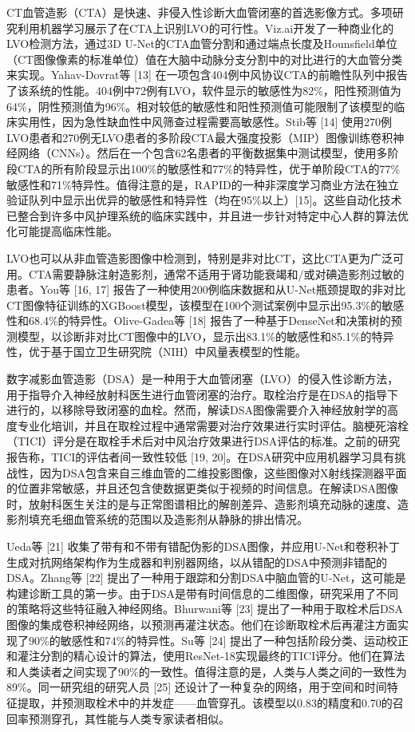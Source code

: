 \documentclass[11pt]{article}
\begin{document}
CT血管造影（CTA）是快速、非侵入性诊断大血管闭塞的首选影像方式。多项研究利用机器学习展示了在CTA上识别LVO的可行性。Viz.ai开发了一种商业化的LVO检测方法，通过3D U-Net的CTA血管分割和通过端点长度及Hounsfield单位（CT图像像素的标准单位）值在大脑中动脉分支分割中的对比进行的大血管分类来实现。Yahav-Dovrat等 [13] 在一项包含404例中风协议CTA的前瞻性队列中报告了该系统的性能。404例中72例有LVO，软件显示的敏感性为82\%，阳性预测值为64\%，阴性预测值为96\%。相对较低的敏感性和阳性预测值可能限制了该模型的临床实用性，因为急性缺血性中风筛查过程需要高敏感性。Stib等 [14] 使用270例LVO患者和270例无LVO患者的多阶段CTA最大强度投影（MIP）图像训练卷积神经网络（CNNs）。然后在一个包含62名患者的平衡数据集中测试模型，使用多阶段CTA的所有阶段显示出100\%的敏感性和77\%的特异性，优于单阶段CTA的77\%敏感性和71\%特异性。值得注意的是，RAPID的一种非深度学习商业方法在独立验证队列中显示出优异的敏感性和特异性（均在95\%以上）[15]。这些自动化技术已整合到许多中风护理系统的临床实践中，并且进一步针对特定中心人群的算法优化可能提高临床性能。

LVO也可以从非血管造影图像中检测到，特别是非对比CT，这比CTA更为广泛可用。CTA需要静脉注射造影剂，通常不适用于肾功能衰竭和/或对碘造影剂过敏的患者。You等 [16, 17] 报告了一种使用200例临床数据和从U-Net瓶颈提取的非对比CT图像特征训练的XGBoost模型，该模型在100个测试案例中显示出95.3\%的敏感性和68.4\%的特异性。Olive-Gadea等 [18] 报告了一种基于DenseNet和决策树的预测模型，以诊断非对比CT图像中的LVO，显示出83.1\%的敏感性和85.1\%的特异性，优于基于国立卫生研究院（NIH）中风量表模型的性能。

数字减影血管造影（DSA）是一种用于大血管闭塞（LVO）的侵入性诊断方法，用于指导介入神经放射科医生进行血管闭塞的治疗。取栓治疗是在DSA的指导下进行的，以移除导致闭塞的血栓。然而，解读DSA图像需要介入神经放射学的高度专业化培训，并且在取栓过程中通常需要对治疗效果进行实时评估。脑梗死溶栓（TICI）评分是在取栓手术后对中风治疗效果进行DSA评估的标准。之前的研究报告称，TICI的评估者间一致性较低 [19, 20]。在DSA研究中应用机器学习具有挑战性，因为DSA包含来自三维血管的二维投影图像，这些图像对X射线探测器平面的位置非常敏感，并且还包含使数据更类似于视频的时间信息。在解读DSA图像时，放射科医生关注的是与正常图谱相比的解剖差异、造影剂填充动脉的速度、造影剂填充毛细血管系统的范围以及造影剂从静脉的排出情况。

Ueda等 [21] 收集了带有和不带有错配伪影的DSA图像，并应用U-Net和卷积补丁生成对抗网络架构作为生成器和判别器网络，以从错配的DSA中预测非错配的DSA。Zhang等 [22] 提出了一种用于跟踪和分割DSA中脑血管的U-Net，这可能是构建诊断工具的第一步。由于DSA是带有时间信息的二维图像，研究采用了不同的策略将这些特征融入神经网络。Bhurwani等 [23] 提出了一种用于取栓术后DSA图像的集成卷积神经网络，以预测再灌注状态。他们在诊断取栓术后再灌注方面实现了90\%的敏感性和74\%的特异性。Su等 [24] 提出了一种包括阶段分类、运动校正和灌注分割的精心设计的算法，使用ResNet-18实现最终的TICI评分。他们在算法和人类读者之间实现了90\%的一致性。值得注意的是，人类与人类之间的一致性为89\%。同一研究组的研究人员 [25] 还设计了一种复杂的网络，用于空间和时间特征提取，并预测取栓术中的并发症——血管穿孔。该模型以0.83的精度和0.70的召回率预测穿孔，其性能与人类专家读者相似。
\end{document}
